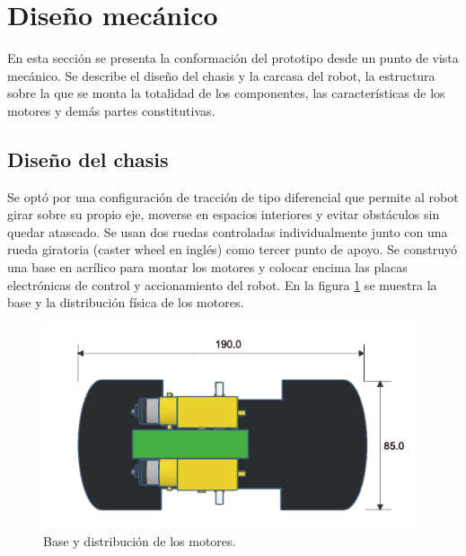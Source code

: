 \pagebreak






\section{Diseño mecánico}

En esta sección se presenta la conformación del prototipo desde un punto de vista mecánico. Se describe el diseño del chasis y la carcasa del robot,  la estructura sobre la que se monta la totalidad de los componentes, las características de los motores y demás partes constitutivas.



\subsection{Diseño del chasis}
Se optó por una configuración de tracción de tipo diferencial \citep{traccion} que permite al robot girar sobre su propio eje, moverse en espacios interiores y evitar obstáculos sin quedar atascado. Se usan dos ruedas controladas individualmente junto con una rueda giratoria (caster wheel en inglés) como tercer punto de apoyo.
Se construyó una base en acrílico para montar los motores y colocar encima las placas electrónicas de control y accionamiento del robot. En la figura \ref{fig:base} se muestra la base y la distribución física de los motores. 

\begin{figure}[h]
	\centering
	\includegraphics[width=11cm]{./Figures/base.png}
	\caption{Base y distribución de los motores.}
	\label{fig:base}
\end{figure}

